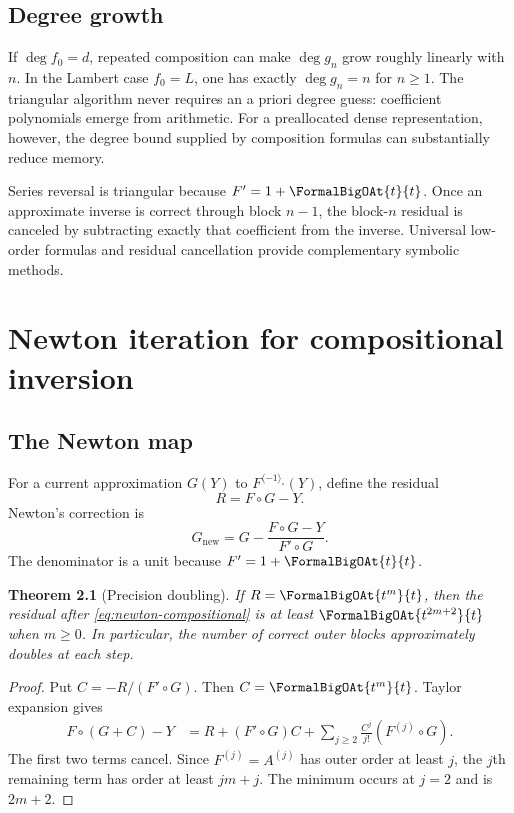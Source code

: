\documentclass[11pt,oneside]{book}
\newtheorem{theorem}{Theorem}[chapter]
\theoremstyle{definition}
\theoremstyle{remark}
\newcommand{\compinv}{^{\langle-1\rangle_{\circ}}}
\newcommand{\compose}{\mathbin{\circ}}
\begin{document}
\section{Degree growth}
If $\deg f_0=d$, repeated composition can make $\deg g_n$ grow roughly
linearly with $n$.  In the Lambert case $f_0=L$, one has exactly
$\deg g_n=n$ for $n\ge1$.  The triangular algorithm never requires an a
priori degree guess: coefficient polynomials emerge from arithmetic.  For a
preallocated dense representation, however, the degree bound supplied by
composition formulas can substantially reduce memory.

\begin{summarybox}
Series reversal is triangular because $F'=1+\FormalBigOAt{t}{t}$.  Once an approximate
inverse is correct through block $n-1$, the block-$n$ residual is canceled by
subtracting exactly that coefficient from the inverse.  Universal low-order
formulas and residual cancellation provide complementary symbolic methods.
\end{summarybox}


\chapter{Newton iteration for compositional inversion}
\label{ch:reversion-newton}

\section{The Newton map}
For a current approximation $G(Y)$ to $F\compinv(Y)$, define the residual
\[
 R=F\compose G-Y.
\]
Newton's correction is
\begin{equation}\label{eq:newton-compositional}
 G_{\mathrm{new}}
 =G-\frac{F\compose G-Y}{F'\compose G}.
\end{equation}
The denominator is a unit because $F'=1+\FormalBigOAt{t}{t}$.

\begin{theorem}[Precision doubling]\label{thm:newton-doubling}
If $R=\FormalBigOAt{t^m}{t}$, then the residual after
\eqref{eq:newton-compositional} is at least
$\FormalBigOAt{t^{2m+2}}{t}$ when $m\ge0$.  In particular, the number of correct outer
blocks approximately doubles at each step.
\end{theorem}
\begin{proof}
Put $C=-R/(F'\compose G)$.  Then $C=\FormalBigOAt{t^m}{t}$.  Taylor expansion gives
\begin{align*}
 F\compose(G+C)-Y
 &=R+(F'\compose G)C
 +\sum_{j\ge2}\frac{C^j}{j!}(F^{(j)}\compose G).
\end{align*}
The first two terms cancel.  Since $F^{(j)}=A^{(j)}$ has outer order at least
$j$, the $j$th remaining term has order at least $jm+j$.  The minimum occurs
at $j=2$ and is $2m+2$.
\end{proof}
\end{document}
